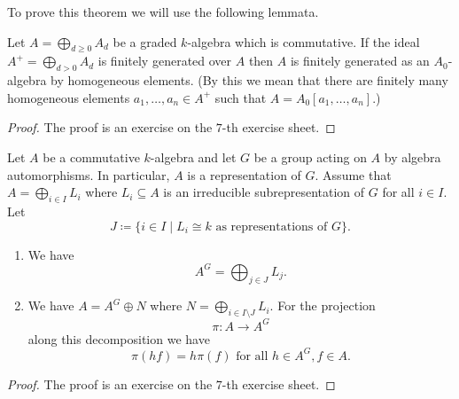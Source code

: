 To prove this theorem we will use the following lemmata.


\begin{lem}\label{lem: technical lemma about generating}
  Let $A = \bigoplus_{d \geq 0} A_d$ be a graded $k$-algebra which is commutative.
  If the ideal $A^+ = \bigoplus_{d > 0} A_d$ is finitely generated over $A$ then $A$ is finitely generated as an $A_0$-algebra by homogeneous elements.
  (By this we mean that there are finitely many homogeneous elements $a_1, \dotsc, a_n \in A^+$ such that $A = A_0[a_1, \dotsc, a_n]$.)
\end{lem}
\begin{proof}
  The proof is an exercise on the $7$-th exercise sheet.
\end{proof}


\begin{lem}\label{lem: projection reynold operator}
  Let $A$ be a commutative $k$-algebra and let $G$ be a group acting on $A$ by algebra automorphisms.
  In particular, $A$ is a representation of $G$.
  Assume that $A = \bigoplus_{i \in I} L_i$ where $L_i \subseteq A$ is an irreducible subrepresentation of $G$ for all $i \in I$.
  Let
  \[
              J
    \coloneqq \{
                i \in I
              \mid
                      L_i
                \cong k
                \text{ as representations of $G$}
              \}.
  \]
  \begin{enumerate}[label=\emph{\alph*)},leftmargin=*]
    \item
      We have
      \[
          A^G
        = \bigoplus_{j \in J} L_j.
      \]
    \item
      We have $A = A^G \oplus N$ where $N = \bigoplus_{i \in I \setminus J} L_i$. For the projection
      \[
                \pi
        \colon  A
        \to     A^G
      \]
      along this decomposition we have
      \[
          \pi(hf)
        = h\pi(f)
        \text{ for all }
        h \in A^G,
        f \in A.
      \]
  \end{enumerate}
\end{lem}
\begin{proof}
  The proof is an exercise on the $7$-th exercise sheet.
\end{proof}



